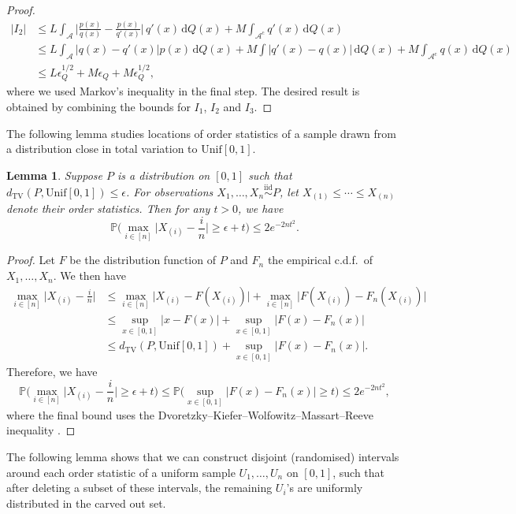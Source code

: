 \documentclass[11pt]{article}
\newtheorem{lemma}[thm]{Lemma}
\newcommand{\iid}{\stackrel{\mathrm{iid}}\sim}
\begin{document}
\begin{proof}
    \begin{align*}
    |I_2| &\leq L \int_{\mathcal{A}} \biggl|\frac{p(x)}{q(x)} - \frac{p(x)}{q'(x)}\biggr|\,q'(x)\, \mathrm{d}Q(x) + M \int_{\mathcal{A}^{\mathrm{c}}} q'(x)\, \mathrm{d}Q(x)\\
    &\leq L\int_{\mathcal{A}} |q(x)-q'(x)|p(x)\, \mathrm{d}Q(x) + M\int |q'(x)-q(x)|\, \mathrm{d}Q(x) + M\int_{\mathcal{A}^{\mathrm{c}}} q(x) \, \mathrm{d}Q(x)\\
    &\leq L\epsilon_Q^{1/2} + M\epsilon_Q + M\epsilon_Q^{1/2},
    \end{align*}
    where we used Markov's inequality in the final step. The desired result is obtained by combining the bounds for $I_1$, $I_2$ and $I_3$.
\end{proof}
The following lemma studies locations of order statistics of a sample drawn from a distribution close in total variation to $\mathrm{Unif}[0,1]$.
\begin{lemma}
    \label{Lemma:DKW}
    Suppose $P$ is a distribution on $[0,1]$ such that $d_{\mathrm{TV}}(P, \mathrm{Unif}[0,1]) \leq \epsilon$. For observations $X_1,\ldots,X_n\iid P$, let $X_{(1)}\leq \cdots\leq X_{(n)}$ denote their order statistics. Then for any $t>0$, we have
\[  
\mathbb{P}\biggl(\max_{i\in[n]} \biggl|X_{(i)} - \frac{i}{n}\biggr| \geq \epsilon + t\biggr) \leq 2e^{-2nt^2}.
\]
\end{lemma}
\begin{proof}
    Let $F$ be the distribution function of $P$ and $F_n$ the empirical c.d.f.\ of $X_1,\ldots,X_n$. We then have
    \begin{align*}
    \max_{i\in[n]} \biggl| X_{(i)} - \frac{i}{n}\biggr| &\leq \max_{i\in[n]} \biggl| X_{(i)} - F(X_{(i)})\biggr| + \max_{i\in[n]} \biggl| F(X_{(i)}) - F_n(X_{(i)})\biggr| \\
    &\leq \sup_{x\in[0,1]}|x-F(x)| + \sup_{x\in[0,1]} |F(x)-F_n(x)| \\
    &\leq d_{\mathrm{TV}}(P, \mathrm{Unif}[0,1]) + \sup_{x\in[0,1]} |F(x)-F_n(x)|.
    \end{align*}
    Therefore, we have 
    \[
    \mathbb{P}\biggl(\max_{i\in[n]} \biggl|X_{(i)} - \frac{i}{n}\biggr| \geq \epsilon + t\biggr) \leq \mathbb{P}\biggl(\sup_{x\in[0,1]} \biggl|F(x) - F_n(x)\biggr| \geq t\biggr)  \leq 2e^{-2nt^2},
    \]
    where the final bound uses the Dvoretzky--Kiefer--Wolfowitz--Massart--Reeve inequality \citep{dvoretzky1956asymptotic,massart1990tight,reeve2024short}.
\end{proof}
The following lemma shows that we can construct disjoint (randomised) intervals around each order statistic of a uniform sample $U_1,\ldots, U_n$ on $[0,1]$, such that after deleting a subset of these intervals, the remaining $U_i$'s are uniformly distributed in the carved out set.
\end{document}
